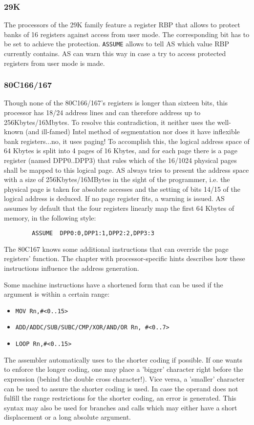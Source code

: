 \documentclass[12pt,twoside]{report}
\newcommand{\tty}[1]{{\tt #1}}
\begin{document}
\subsubsection{29K}

The processors of the 29K family feature a register RBP that allows
to protect banks of 16 registers against access from user mode.  The
corresponding bit has to be set to achieve the protection.  \tty{ASSUME}
allows to tell AS which value RBP currently contains.  AS can warn
this way in case a try to access protected registers from user mode
is made.


\subsubsection{80C166/167}

Though none of the 80C166/167's registers is longer than sixteen bits,
this processor has 18/24 address lines and can therefore address up
to 256Kbytes/16Mbytes.  To resolve this contradiction, it neither
uses the well-known (and ill-famed) Intel method of segmentation nor
does it have inflexible bank registers...no, it uses paging!  To accomplish
this, the logical address space of 64 Kbytes is split into 4 pages of
16 Kbytes, and for each page there is a page register (named
DPP0..DPP3) that rules which of the 16/1024 physical pages shall be
mapped to this logical page.  AS always tries to present the address
space with a size of 256Kbytes/16MBytes in the sight of the
programmer, i.e. the physical page is taken for absolute accesses and
the setting of bits 14/15 of the logical address is deduced.  If no
page register fits, a warning is issued.  AS assumes by default that
the four registers linearly map the first 64 Kbytes of memory, in the
following style:
\begin{verbatim}
        ASSUME  DPP0:0,DPP1:1,DPP2:2,DPP3:3
\end{verbatim}
The 80C167 knows some additional instructions that can override the
page registers' function.  The chapter with processor-specific hints
describes how these instructions influence the address generation.
\par
Some machine instructions have a shortened form that can be used if
the argument is within a certain range:
\begin{itemize}
\item{\verb!MOV Rn,#<0..15>!}
\item{\verb!ADD/ADDC/SUB/SUBC/CMP/XOR/AND/OR Rn, #<0..7>!}
\item{\verb!LOOP Rn,#<0..15>!}
\end{itemize}
The assembler automatically uses to the shorter coding if possible.
If one wants to enforce the longer coding, one may place a 'bigger'
character right before the expression (behind the double cross character!).
Vice versa, a 'smaller' character can be used to assure the shorter
coding is used.  In case the operand does not fulfill the range
restrictions for the shorter coding, an error is generated.  This syntax
may also be used for branches and calls which may either have a short
displacement or a long absolute argument.
\end{document}
